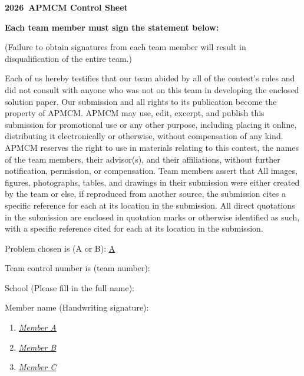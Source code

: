 \documentclass[a4paper,12pt]{article}
\newcommand{\MCMYear}{2026}
\newcommand{\TeamNumber}{0000}
\newcommand{\ProblemChosen}{A}
\begin{document}
\thispagestyle{empty}
\vspace*{-1.8em}
\begin{center}
  \textbf{\LARGE \MCMYear\ APMCM Control Sheet}
\end{center}
\vspace{1.0em}

\noindent\textbf{Each team member must sign the statement below:}

\medskip

\noindent (Failure to obtain signatures from each team member will result in disqualification of the entire team.)

\medskip

\noindent Each of us hereby testifies that our team abided by all of the contest's rules and did not consult with anyone who was not on this team in developing the enclosed solution paper. Our submission and all rights to its publication become the property of APMCM. APMCM may use, edit, excerpt, and publish this submission for promotional use or any other purpose, including placing it online, distributing it electronically or otherwise, without compensation of any kind. APMCM reserves the right to use in materials relating to this contest, the names of the team members, their advisor(s), and their affiliations, without further notification, permission, or compensation. Team members assert that All images, figures, photographs, tables, and drawings in their submission were either created by the team or else, if reproduced from another source, the submission cites a specific reference for each at its location in the submission. All direct quotations in the submission are enclosed in quotation marks or otherwise identified as such, with a specific reference cited for each at its location in the submission.

\medskip

\noindent Problem chosen is (A or B): \underline{\quad\ProblemChosen\quad}

\medskip

\noindent Team control number is (team number): \underline{\quad\TeamNumber\quad}

\medskip

\noindent School (Please fill in the full name): \underline{\quad\hspace{8cm}\quad}

\medskip

\noindent Member name (Handwriting signature):
\begin{enumerate}
  \setlength{\itemsep}{0.28em}
  \item \underline{\quad\textit{Member A}\hspace{7cm}\quad}
  \item \underline{\quad\textit{Member B}\hspace{7cm}\quad}
  \item \underline{\quad\textit{Member C}\hspace{7cm}\quad}
\end{enumerate}
\end{document}

